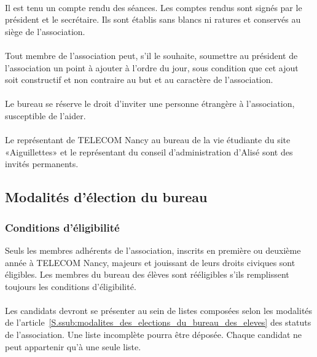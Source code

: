\documentclass{article} %
\begin{document}
                \paragraph{}
				Il est tenu un compte rendu des séances. Les comptes rendus sont
				signés par le président et le secrétaire. Ils sont établis sans
				blancs ni ratures et conservés au siège de l’association.

                \paragraph{}
				Tout membre de l’association peut, s’il le souhaite, soumettre
				au président de l’association un point à ajouter à l’ordre du
				jour, sous condition que cet ajout soit constructif et non
				contraire au but et au caractère de l’association.

                \paragraph{}
				Le bureau se réserve le droit d’inviter une personne étrangère à
				l’association, susceptible de l’aider. 

                \paragraph{}
				Le représentant de TELECOM Nancy au bureau de la vie étudiante
				du site «Aiguillettes» et le représentant du conseil
				d’administration d’Alisé sont des invités permanents.

		\subsection{Modalités d'élection du bureau}
\label{sub:modalites_d_election_du_bureau}

			\subsubsection{Conditions d'éligibilité}
\label{ssub:conditions_d_eligibilite}

				Seuls les membres adhérents de l'association, inscrits en
				première ou deuxième année à TELECOM Nancy, majeurs et jouissant
				de leurs droits civiques sont éligibles. Les membres du bureau
				des élèves sont rééligibles s’ils remplissent toujours les
				conditions d’éligibilité.

                \paragraph{}
				Les candidats devront se présenter au sein de listes composées
				selon les modalités de
				l’article~\ref{S.ssub:modalites_des_elections_du_bureau_des_eleves}
				des statuts de l’association. Une liste incomplète pourra être
				déposée. Chaque candidat ne peut appartenir qu’à une seule
				liste.
\end{document}
